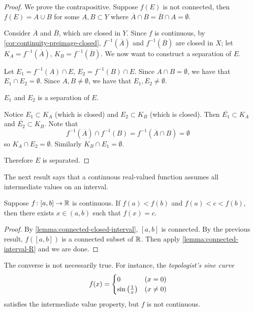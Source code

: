 \begin{proof}
We prove the contrapositive. Suppose $f(E)$ is not connected, then $f(E)=A\cup B$ for some $A,B\subset Y$ where $\overline{A}\cap B=\overline{B}\cap A=\emptyset$.

Consider $\overline{A}$ and $\overline{B}$, which are closed in $Y$. Since $f$ is continuous, by \ref{cor:continuity-preimage-closed}, $f^{-1}(\overline{A})$ and $f^{-1}(\overline{B})$ are closed in $X$; let $K_A=f^{-1}(\overline{A})$, $K_B=f^{-1}(\overline{B})$. We now want to construct a separation of $E$.

Let $E_1=f^{-1}(A)\cap E$, $E_2=f^{-1}(B)\cap E$. Since $A\cap B=\emptyset$, we have that $E_1\cap E_2=\emptyset$. Since $A,B\neq\emptyset$, we have that $E_1,E_2\neq\emptyset$. 
\begin{claim}
$E_1$ and $E_2$ is a separation of $E$.
\end{claim}
Notice $E_1\subset K_A$ (which is closed) and $E_2\subset K_B$ (which is closed). Then $\overline{E_1}\subset K_A$ and $\overline{E_2}\subset K_B$. Note that
\[f^{-1}(\overline{A})\cap f^{-1}(B)=f^{-1}(\overline{A}\cap B)=\emptyset\]
so $K_A\cap E_2=\emptyset$. Similarly $K_B\cap E_1=\emptyset$.

Therefore $E$ is separated.
\end{proof}

The next result says that a continuous real-valued function assumes all intermediate values on an interval. 

\begin{theorem}
Suppose $f\colon [a,b]\to\mathbb R$ is continuous. If $f(a)<f(b)$ and $f(a)<c<f(b)$, then there exists $x\in(a,b)$ such that $f(x)=c$.
\end{theorem}

\begin{proof}
By \ref{lemma:connected-closed-interval}, $[a,b]$ is connected. 
By the previous result, $f([a,b])$ is a connected subset of $\mathbb R$. 
Then apply \ref{lemma:connected-interval-R} and we are done.
\end{proof}

\begin{remark}
The converse is not necessarily true. For instance, the \emph{topologist's sine curve}
\[f(x)=\begin{cases}
0&(x=0)\\
\sin\left(\frac{1}{x}\right)&(x\neq0)
\end{cases}\]
satisfies the intermediate value property, but $f$ is not continuous.
\end{remark}

